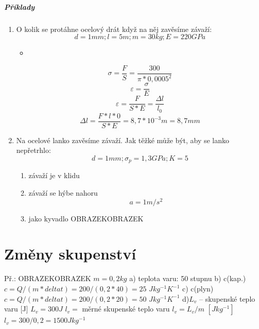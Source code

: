 \documentclass{article}
\begin{document}
        \subsubsection{Příklady}
        \begin{enumerate}
          \item O kolik se protáhne ocelový drát když na něj zavěsíme závaží:
          \begin{equation*}
            d = 1 mm;
            l = 5 m;
            m = 30 kg;
            E = 220 GPa
          \end{equation*}
          \begin{itemize}
            \item[]
          \end{itemize}
          \begin{equation*}
            \sigma=\frac{F}{S}=\frac{300}{\pi*0,0005^2}
          \end{equation*}
          \begin{equation*}
            \varepsilon = \frac{\sigma}{E}
          \end{equation*}
          \begin{equation*}
            \varepsilon = \frac{F}{S*E}=\frac{\Delta l}{l_0}
          \end{equation*}
          \begin{equation*}
            \Delta l = \frac{F*l*0}{S*E}=8,7*10^{-3} m = 8,7 mm
          \end{equation*}
          \item Na ocelové lanko zavěsíme závaží. Jak těžké může být, aby se lanko nepřetrhlo:
          \begin{equation*}
            d = 1 mm;
            \sigma_p = 1,3 GPa;
            K = 5
          \end{equation*}
          \begin{enumerate}
            \item závaží je v klidu
            \item závaží se hýbe nahoru
            \begin{equation*}
              a = 1 m/s^2
            \end{equation*}
            \item jako kyvadlo OBRAZEKOBRAZEK
          \end{enumerate}
        \end{enumerate}

\part{Změny skupenství}
Př.: OBRAZEKOBRAZEK
$m = 0,2 kg$
a) teplota varu: 50 stupnu
b) c(kap.) $c = Q/(m*deltat)=200/(0,2*40) = 25$ $Jkg^{-1}K^{-1}$
c) c(plyn) $c = Q/(m*deltat)=200/(0,2*20) = 50$ $Jkg^{-1}K^{-1}$
d)$L_v$ -- skupenské teplo varu [J]
$L_v = 300 J$
$l_v = $ měrné skupenské teplo varu $l_v = L_v/m$ $[Jkg^{-1}]$
$l_v = 300/0,2 = 1500 Jkg^{-1}$
\end{document}
